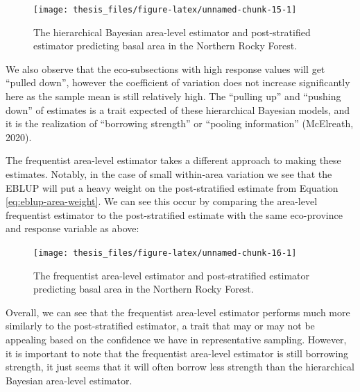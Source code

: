 \documentclass[12pt,twoside]{reedthesis}
\begin{document}
\begin{figure}

{\centering \texttt{[image: thesis\_files/figure-latex/unnamed-chunk-15-1]} 

}

\caption[HB Area and Post-stratified estimates in M333]{The hierarchical Bayesian area-level estimator and post-stratified estimator predicting basal area in the Northern Rocky Forest.}\label{fig:unnamed-chunk-15}
\end{figure}
We also observe that the eco-subsections with high response values will get ``pulled down'', however the coefficient of variation does not increase significantly here as the sample mean is still relatively high. The ``pulling up'' and ``pushing down'' of estimates is a trait expected of these hierarchical Bayesian models, and it is the realization of ``borrowing strength'' or ``pooling information'' (McElreath, 2020).

The frequentist area-level estimator takes a different approach to making these estimates. Notably, in the case of small within-area variation we see that the EBLUP will put a heavy weight on the post-stratified estimate from Equation \eqref{eq:eblup-area-weight}. We can see this occur by comparing the area-level frequentist estimator to the post-stratified estimate with the same eco-province and response variable as above:
\begin{figure}

{\centering \texttt{[image: thesis\_files/figure-latex/unnamed-chunk-16-1]} 

}

\caption[EBLUP area-level and Post-stratified estimates in M333]{The frequentist area-level estimator and post-stratified estimator predicting basal area in the Northern Rocky Forest.}\label{fig:unnamed-chunk-16}
\end{figure}
Overall, we can see that the frequentist area-level estimator performs much more similarly to the post-stratified estimator, a trait that may or may not be appealing based on the confidence we have in representative sampling. However, it is important to note that the frequentist area-level estimator is still borrowing strength, it just seems that it will often borrow less strength than the hierarchical Bayesian area-level estimator.
\end{document}
